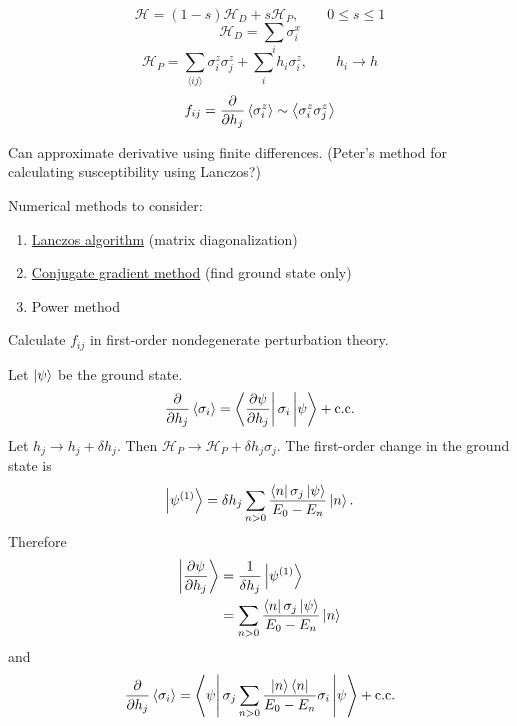 %

\usepackage{hyperref}

\newcommand{\ham}{\mathcal{H}}
\newcommand{\nnsum}[2]{\sum_{\langle #1 #2 \rangle}}
\newcommand{\cc}{\mathrm{c.c.}}


\begin{equation}
  \ham = (1 - s) \ham_D + s \ham_P,
  \qquad
  0 \leq s \leq 1
  \label{def-h_qaa}
\end{equation}
\begin{equation}
  \ham_D = \sum_i \sigma^x_i
  \label{def-h_d}
\end{equation}
\begin{equation}
  \ham_P = \nnsum{i}{j} \sigma^z_i \sigma^z_j + \sum_i h_i \sigma^z_i,
  \qquad
  h_i \rightarrow h
  \label{def-h_p}
\end{equation}
\begin{equation}
  f_{ij} = \frac{\partial }{\partial h_j} \left< \sigma^z_i \right>
  \sim \left< \sigma^z_i \sigma^z_j \right>
  \label{def-f}
\end{equation}

Can approximate derivative using finite differences. (Peter's method for
calculating susceptibility using Lanczos?)

Numerical methods to consider:
\begin{enumerate}
  \item \href{http://en.wikipedia.org/wiki/Lanczos_algorithm}
    {Lanczos algorithm} (matrix diagonalization)
  \item \href{http://en.wikipedia.org/wiki/Conjugate_gradient_method}
    {Conjugate gradient method} (find ground state only)
  \item Power method
\end{enumerate}

Calculate $f_{ij}$ in first-order nondegenerate perturbation theory.

Let $\left| \psi \right>$ be the ground state.
\begin{equation}
  \pd{}{h_j} \avg{\sigma_i}
  = \matrixel{\pd{\psi}{h_j}}{\sigma_i}{\psi} + \cc
  \label{}
\end{equation}
Let
$h_j \rightarrow h_j + \delta h_j$.
Then
$\ham_P \rightarrow \ham_P + \delta h_j \sigma_j$.
The first-order change in the ground state is
\begin{equation}
  \ket{\psi^{(1)}}
  = \delta h_j \sum_{n>0} \frac{\matrixel{n}{\sigma_j}{\psi}}{E_0 - E_n} \ket{n}.
  \label{}
\end{equation}
Therefore
\begin{align}
  \ket{\pd{\psi}{h_j}}
  &= \frac{1}{\delta h_j} \ket{\psi^{(1)}} \\
  &= \sum_{n>0} \frac{\matrixel{n}{\sigma_j}{\psi}}{E_0 - E_n} \ket{n}
  \label{}
\end{align}
and
\begin{equation}
  \pd{}{h_j} \avg{\sigma_i}
  = \matrixel{\psi} {\sigma_j \sum_{n>0} \frac{\ket{n} \bra{n}}{E_0 - E_n} \sigma_i} {\psi} + \cc
  \label{}
\end{equation}



